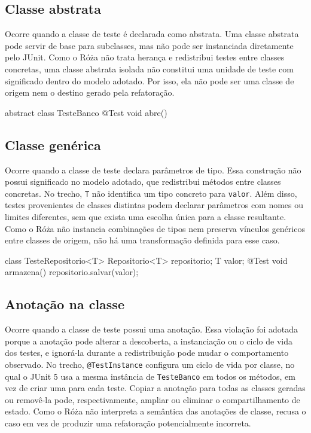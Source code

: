 \subsection{Classe abstrata}

Ocorre quando a classe de teste é declarada como abstrata. Uma classe abstrata pode servir de base para subclasses, mas não pode ser instanciada diretamente pelo JUnit. Como o Róża não trata herança e redistribui testes entre classes concretas, uma classe abstrata isolada não constitui uma unidade de teste com significado dentro do modelo adotado. Por isso, ela não pode ser uma classe de origem nem o destino gerado pela refatoração.

\begin{violationexample}
abstract class TesteBanco {
    @Test void abre() {}
}
\end{violationexample}

\subsection{Classe genérica}

Ocorre quando a classe de teste declara parâmetros de tipo. Essa construção não possui significado no modelo adotado, que redistribui métodos entre classes concretas. No trecho, \texttt{T} não identifica um tipo concreto para \texttt{valor}. Além disso, testes provenientes de classes distintas podem declarar parâmetros com nomes ou limites diferentes, sem que exista uma escolha única para a classe resultante. Como o Róża não instancia combinações de tipos nem preserva vínculos genéricos entre classes de origem, não há uma transformação definida para esse caso.

\begin{violationexample}
class TesteRepositorio<T> {
    Repositorio<T> repositorio;
    T valor;
    @Test void armazena() { repositorio.salvar(valor); }
}
\end{violationexample}

\subsection{Anotação na classe}

Ocorre quando a classe de teste possui uma anotação. Essa violação foi adotada porque a anotação pode alterar a descoberta, a instanciação ou o ciclo de vida dos testes, e ignorá-la durante a redistribuição pode mudar o comportamento observado. No trecho, \texttt{@TestInstance} configura um ciclo de vida por classe, no qual o JUnit 5 usa a mesma instância de \texttt{TesteBanco} em todos os métodos, em vez de criar uma para cada teste. Copiar a anotação para todas as classes geradas ou removê-la pode, respectivamente, ampliar ou eliminar o compartilhamento de estado. Como o Róża não interpreta a semântica das anotações de classe, recusa o caso em vez de produzir uma refatoração potencialmente incorreta.

